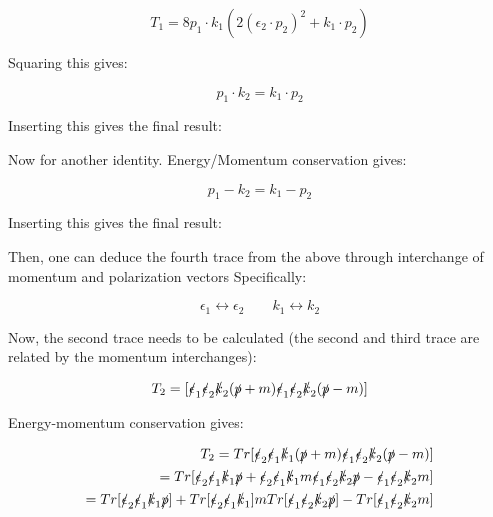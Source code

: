 \documentclass[a4]{article}
\begin{document}
    \begin{equation}
        T_1 = 8 p_1 \cdot k_1 (2 (\epsilon_2 \cdot p_2)^2 + k_1 \cdot p_2)
    \end{equation}

    Squaring this gives:

    \begin{equation}
        p_1 \cdot k_2 = k_1 \cdot p_2
    \end{equation}

    Inserting this gives the final result:

    Now for another identity. Energy/Momentum conservation gives:

    \begin{equation}
        p_1 - k_2 = k_1 - p_2
    \end{equation}

    Inserting this gives the final result:

    \begin{center}
    \end{center}

    Then, one can deduce the fourth trace from the above through interchange of momentum and polarization vectors Specifically:

    \[
        \epsilon_1 \leftrightarrow \epsilon_2 \qquad k_1 \leftrightarrow k_2
    \]

    Now, the second trace needs to be calculated (the second and third trace are related by the momentum interchanges):

    \begin{equation}
        T_2 = [\slashed{\epsilon}_1 \slashed{\epsilon}_2 \slashed{k}_2 (\slashed{p} + m) \slashed{\epsilon}_1 \slashed{\epsilon}_2 \slashed{k}_2 (\slashed{p} - m)]
    \end{equation}

    Energy-momentum conservation gives:

    \begin{eqnarray}
        T_2 = Tr [\slashed{\epsilon}_2 \slashed{\epsilon}_1 \slashed{k}_1 (\slashed{p} + m) \slashed{\epsilon}_1 \slashed{\epsilon}_2 \slashed{k}_2 (\slashed{p} - m)] \\
        = Tr [\slashed{\epsilon}_2 \slashed{\epsilon}_1 \slashed{k}_1 \slashed{p} + \slashed{\epsilon}_2 \slashed{\epsilon}_1 \slashed{k}_1 m \slashed{\epsilon}_1 \slashed{\epsilon}_2 \slashed{k}_2 \slashed{p} - \slashed{\epsilon}_1 \slashed{\epsilon}_2 \slashed{k}_2 m] \\
        = Tr [\slashed{\epsilon}_2 \slashed{\epsilon}_1 \slashed{k}_1 \slashed{p}] + Tr [\slashed{\epsilon}_2 \slashed{\epsilon}_1 \slashed{k}_1] m Tr [\slashed{\epsilon}_1 \slashed{\epsilon}_2 \slashed{k}_2 \slashed{p}] - Tr[\slashed{\epsilon}_1 \slashed{\epsilon}_2 \slashed{k}_2 m]
    \end{eqnarray}
\end{document}
